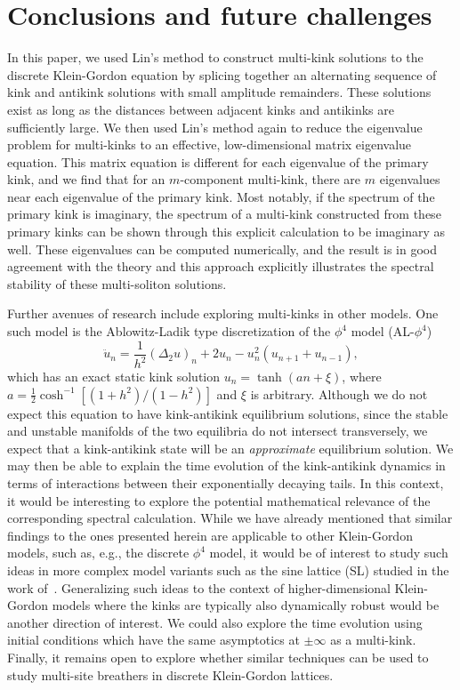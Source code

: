 \documentclass[12pt,reqno]{amsart}
\begin{document}
\section{Conclusions and future challenges}\label{sec:conclusions}

In this paper, we used Lin's method to construct multi-kink solutions to the discrete Klein-Gordon equation by splicing together an alternating sequence of kink and antikink solutions with small amplitude remainders. These solutions exist as long as the distances between adjacent kinks and antikinks are sufficiently large. We then used Lin's method again to reduce the eigenvalue problem for multi-kinks to an effective, low-dimensional matrix 
eigenvalue equation. This matrix equation is different for each eigenvalue of the primary kink, and we find that for an $m$-component multi-kink, there are $m$ eigenvalues near each eigenvalue of the primary kink. Most notably, if the spectrum of the primary kink is imaginary, the spectrum of a multi-kink constructed from these primary kinks can be shown through this
explicit calculation to be imaginary as well. These eigenvalues can be computed numerically, and the result is in good agreement with the theory and this approach explicitly illustrates the 
spectral stability of these multi-soliton solutions.

Further avenues of research include exploring multi-kinks in other models. One such model is the Ablowitz-Ladik type discretization of the $\phi^4$ model (AL-$\phi^4$) \cite{kevrekidis2003}
\begin{equation}
	\ddot{u}_n = \frac{1}{h^2}(\Delta_2 u)_n + 2 u_n - u_n^2 (u_{n+1}+u_{n-1}),
\end{equation}
which has an exact static kink solution $u_n = \tanh(a n + \xi)$, where $a = \frac{1}{2} \cosh^{-1}[(1+h^2)/(1-h^2) ]$ and $\xi$ is arbitrary. Although we do not expect this equation to have kink-antikink equilibrium solutions, since the stable and unstable manifolds of the two equilibria do not intersect transversely, we expect that a kink-antikink state will be an {\it approximate} equilibrium solution. We may then be able to explain the time evolution of the kink-antikink dynamics in terms of interactions between their exponentially decaying tails. 
In this context, it would be interesting to explore the
potential mathematical relevance of the corresponding
spectral calculation.
While we have already mentioned
that similar findings to the ones presented herein
are applicable to other Klein-Gordon models, such as,
e.g., the discrete $\phi^4$ model, it would be of
interest to study such ideas in more complex model variants 
such as the sine lattice (SL) studied in the work
of~\cite{Takeno1986}. 
Generalizing such ideas to the context of higher-dimensional
Klein-Gordon models where the kinks are typically also 
dynamically robust would be another direction of interest.
{We could also explore the time evolution using initial conditions which have the same asymptotics at $\pm \infty$ as a multi-kink.}
Finally, it remains open to explore whether similar techniques 
can be used to study multi-site breathers in discrete 
Klein-Gordon lattices.
\end{document}
